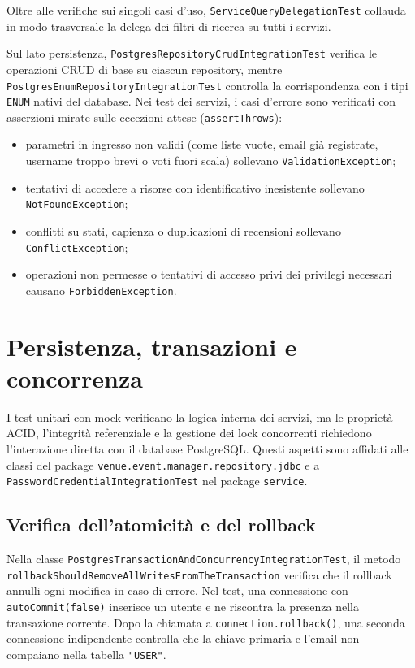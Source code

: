 Oltre alle verifiche sui singoli casi d'uso, \texttt{ServiceQueryDelegationTest} collauda in modo trasversale la delega dei filtri di ricerca su tutti i servizi.

Sul lato persistenza, \texttt{PostgresRepositoryCrudIntegrationTest} verifica le operazioni CRUD di base su ciascun repository, mentre \texttt{PostgresEnumRepositoryIntegrationTest} controlla la corrispondenza con i tipi \texttt{ENUM} nativi del database.
Nei test dei servizi, i casi d'errore sono verificati con asserzioni mirate sulle eccezioni attese (\texttt{assertThrows}):
\begin{itemize}
  \item parametri in ingresso non validi (come liste vuote, email già registrate, username troppo brevi o voti fuori scala) sollevano \texttt{ValidationException};
  \item tentativi di accedere a risorse con identificativo inesistente sollevano \texttt{NotFoundException};
  \item conflitti su stati, capienza o duplicazioni di recensioni sollevano \texttt{ConflictException};
  \item operazioni non permesse o tentativi di accesso privi dei privilegi necessari causano \texttt{ForbiddenException}.
\end{itemize}

\section{Persistenza, transazioni e concorrenza}
\label{sec:test-persistenza-concorrenza}
I test unitari con mock verificano la logica interna dei servizi, ma le proprietà ACID, l'integrità referenziale e la gestione dei lock concorrenti richiedono l'interazione diretta con il database PostgreSQL.
Questi aspetti sono affidati alle classi del package \texttt{venue.event.manager.repository.jdbc} e a \texttt{PasswordCredentialIntegrationTest} nel package \texttt{service}.

\subsection{Verifica dell'atomicità e del rollback}
\label{sec:verifica-atomicita-rollback}
Nella classe \texttt{Postgres\allowbreak{}Transaction\allowbreak{}And\allowbreak{}Concurrency\allowbreak{}Integration\allowbreak{}Test}, il metodo \texttt{rollback\allowbreak{}Should\allowbreak{}Remove\allowbreak{}All\allowbreak{}Writes\allowbreak{}From\allowbreak{}The\allowbreak{}Transaction} verifica che il rollback annulli ogni modifica in caso di errore.
Nel test, una connessione con \texttt{autoCommit(false)} inserisce un utente e ne riscontra la presenza nella transazione corrente.
Dopo la chiamata a \texttt{connection.rollback()}, una seconda connessione indipendente controlla che la chiave primaria e l'email non compaiano nella tabella \texttt{"USER"}.

